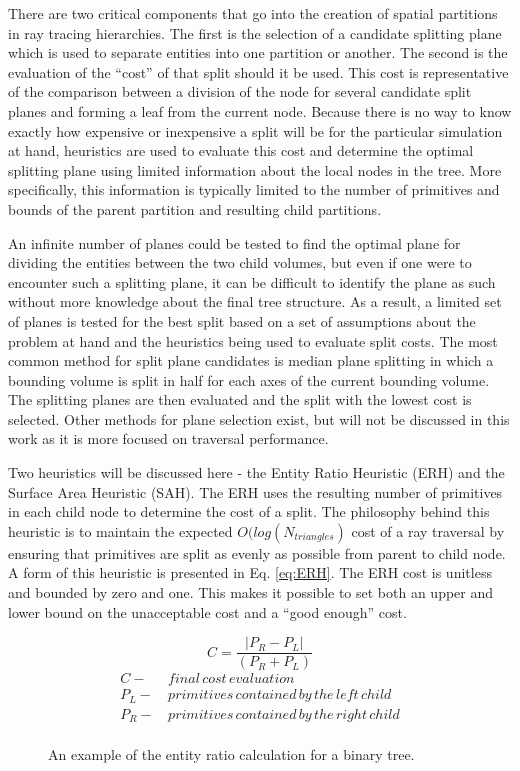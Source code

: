 There are two critical components that go into the creation of spatial
partitions in ray tracing hierarchies. The first is the selection of a candidate
splitting plane which is used to separate entities into one partition or
another. The second is the evaluation of the ``cost'' of that split should it be
used. This cost is representative of the comparison between a division of the
node for several candidate split planes and forming a leaf from the current
node.  Because there is no way to know exactly how expensive or inexpensive a
split will be for the particular simulation at hand, heuristics are used to
evaluate this cost and determine the optimal splitting plane using limited
information about the local nodes in the tree. More specifically, this
information is typically limited to the number of primitives and bounds of the
parent partition and resulting child partitions.

An infinite number of planes could be tested to find the optimal plane for
dividing the entities between the two child volumes, but even if one were to
encounter such a splitting plane, it can be difficult to identify the plane as
such without more knowledge about the final tree structure. As a result, a
limited set of planes is tested for the best split based on a set of assumptions
about the problem at hand and the heuristics being used to evaluate split
costs. The most common method for split plane candidates is median plane
splitting in which a bounding volume is split in half for each axes of the
current bounding volume. The splitting planes are then evaluated and the split
with the lowest cost is selected. Other methods for plane selection exist, but
will not be discussed in this work as it is more focused on traversal performance.

Two heuristics will be discussed here - the Entity Ratio Heuristic (ERH) and the
Surface Area Heuristic (SAH). The ERH uses the resulting number of
primitives in each child node to determine the cost of a split. The philosophy
behind this heuristic is to maintain the expected $O(log(N_{triangles})$ cost of
a ray traversal by ensuring that primitives are split as evenly as possible from
parent to child node. A form of this heuristic is presented in
Eq. \ref{eq:ERH}. The ERH cost is unitless and bounded by zero and
one. This makes it possible to set both an upper and lower bound on the
unacceptable cost and a ``good enough'' cost.

\begin{figure}[H]
\begin{equation}
\label{eq:ERH}
 C = \frac{|P_{R}-P_{L}|}{(P_{R} + P_{L})} 
\end{equation}
  \begin{align*}
    C - & \,final \, cost \, evaluation \\
    P_{L} - & \, primitives\, contained\, by\, the\, left\, child  \\
    P_{R} - & \, primitives\, contained\, by\, the\, right\, child \\
  \end{align*}
  \caption{An example of the entity ratio calculation for a binary tree.}
  \label{fig:ERH}
\end{figure}

